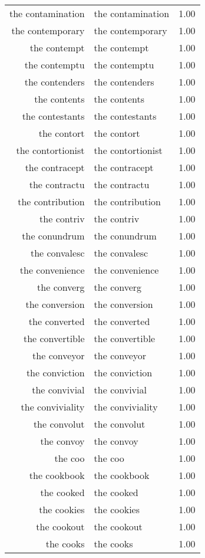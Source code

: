 \begin{table}[ht]
\begin{tabular}{rlr}
  the contamination & the contamination & 1.00 \\ 
  the contemporary & the contemporary & 1.00 \\ 
  the contempt & the contempt & 1.00 \\ 
  the contemptu & the contemptu & 1.00 \\ 
  the contenders & the contenders & 1.00 \\ 
  the contents & the contents & 1.00 \\ 
  the contestants & the contestants & 1.00 \\ 
  the contort & the contort & 1.00 \\ 
  the contortionist & the contortionist & 1.00 \\ 
  the contracept & the contracept & 1.00 \\ 
  the contractu & the contractu & 1.00 \\ 
  the contribution & the contribution & 1.00 \\ 
  the contriv & the contriv & 1.00 \\ 
  the conundrum & the conundrum & 1.00 \\ 
  the convalesc & the convalesc & 1.00 \\ 
  the convenience & the convenience & 1.00 \\ 
  the converg & the converg & 1.00 \\ 
  the conversion & the conversion & 1.00 \\ 
  the converted & the converted & 1.00 \\ 
  the convertible & the convertible & 1.00 \\ 
  the conveyor & the conveyor & 1.00 \\ 
  the conviction & the conviction & 1.00 \\ 
  the convivial & the convivial & 1.00 \\ 
  the conviviality & the conviviality & 1.00 \\ 
  the convolut & the convolut & 1.00 \\ 
  the convoy & the convoy & 1.00 \\ 
  the coo & the coo & 1.00 \\ 
  the cookbook & the cookbook & 1.00 \\ 
  the cooked & the cooked & 1.00 \\ 
  the cookies & the cookies & 1.00 \\ 
  the cookout & the cookout & 1.00 \\ 
  the cooks & the cooks & 1.00 \\ 

\end{tabular}
\end{table}
